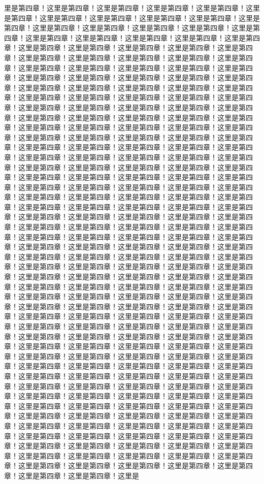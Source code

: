 里是第四章！这里是第四章！这里是第四章！这里是第四章！这里是第四章！这里是第四章！这里是第四章！这里是第四章！这里是第四章！这里是第四章！这里是第四章！这里是第四章！这里是第四章！这里是第四章！这里是第四章！这里是第四章！这里是第四章！这里是第四章！这里是第四章！这里是第四章！这里是第四章！这里是第四章！这里是第四章！这里是第四章！这里是第四章！这里是第四章！这里是第四章！这里是第四章！这里是第四章！这里是第四章！这里是第四章！这里是第四章！这里是第四章！这里是第四章！这里是第四章！这里是第四章！这里是第四章！这里是第四章！这里是第四章！这里是第四章！这里是第四章！这里是第四章！这里是第四章！这里是第四章！这里是第四章！这里是第四章！这里是第四章！这里是第四章！这里是第四章！这里是第四章！这里是第四章！这里是第四章！这里是第四章！这里是第四章！这里是第四章！这里是第四章！这里是第四章！这里是第四章！这里是第四章！这里是第四章！这里是第四章！这里是第四章！这里是第四章！这里是第四章！这里是第四章！这里是第四章！这里是第四章！这里是第四章！这里是第四章！这里是第四章！这里是第四章！这里是第四章！这里是第四章！这里是第四章！这里是第四章！这里是第四章！这里是第四章！这里是第四章！这里是第四章！这里是第四章！这里是第四章！这里是第四章！这里是第四章！这里是第四章！这里是第四章！这里是第四章！这里是第四章！这里是第四章！这里是第四章！这里是第四章！这里是第四章！这里是第四章！这里是第四章！这里是第四章！这里是第四章！这里是第四章！这里是第四章！这里是第四章！这里是第四章！这里是第四章！这里是第四章！这里是第四章！这里是第四章！这里是第四章！这里是第四章！这里是第四章！这里是第四章！这里是第四章！这里是第四章！这里是第四章！这里是第四章！这里是第四章！这里是第四章！这里是第四章！这里是第四章！这里是第四章！这里是第四章！这里是第四章！这里是第四章！这里是第四章！这里是第四章！这里是第四章！这里是第四章！这里是第四章！这里是第四章！这里是第四章！这里是第四章！这里是第四章！这里是第四章！这里是第四章！这里是第四章！这里是第四章！这里是第四章！这里是第四章！这里是第四章！这里是第四章！这里是第四章！这里是第四章！这里是第四章！这里是第四章！这里是第四章！这里是第四章！这里是第四章！这里是第四章！这里是第四章！这里是第四章！这里是第四章！这里是第四章！这里是第四章！这里是第四章！这里是第四章！这里是第四章！这里是第四章！这里是第四章！这里是第四章！这里是第四章！这里是第四章！这里是第四章！这里是第四章！这里是第四章！这里是第四章！这里是第四章！这里是第四章！这里是第四章！这里是第四章！这里是第四章！这里是第四章！这里是第四章！这里是第四章！这里是第四章！这里是第四章！这里是第四章！这里是第四章！这里是第四章！这里是第四章！这里是第四章！这里是第四章！这里是第四章！这里是第四章！这里是第四章！这里是第四章！这里是第四章！这里是第四章！这里是第四章！这里是第四章！这里是第四章！这里是第四章！这里是第四章！这里是第四章！这里是第四章！这里是第四章！这里是第四章！这里是第四章！这里是第四章！这里是第四章！这里是第四章！这里是第四章！这里是第四章！这里是第四章！这里是第四章！这里是第四章！这里是第四章！这里是第四章！这里是第四章！这里是第四章！这里是第四章！这里是第四章！这里是第四章！这里是第四章！这里是第四章！这里是第四章！这里是第四章！这里是第四章！这里是第四章！这里是第四章！这里是第四章！这里是第四章！这里是第四章！这里是第四章！这里是第四章！这里是第四章！这里是第四章！这里是第四章！这里是第四章！这里是第四章！这里是第四章！这里是第四章！这里是第四章！这里是第四章！这里是第四章！这里是第四章！这里是第四章！这里是第四章！这里是第四章！这里是第四章！这里是第四章！这里是第四章！这里是第四章！这里是